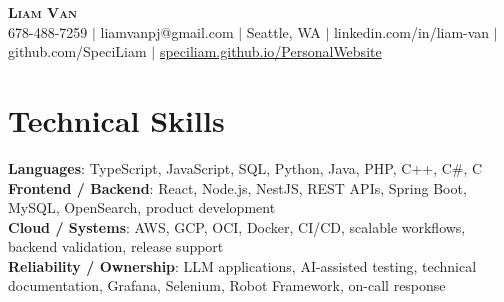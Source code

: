 \documentclass[letterpaper,11pt]{article}
\begin{document}

%
\begin{center}
    \textbf{\Huge \scshape Liam Van} \\ \vspace{1pt}
    \small 678-488-7259 $|$ \small {liamvanpj@gmail.com} $|$ Seattle, WA
 {{$|$ linkedin.com/in/liam-van} {$|$ github.com/SpeciLiam} {$|$ \href{https://speciliam.github.io/PersonalWebsite}{speciliam.github.io/PersonalWebsite}}}

\end{center}

\section{Technical Skills}
 \begin{itemize}[leftmargin=0.15in, label={}]
    \small{\item{
     \textbf{Languages}{: TypeScript, JavaScript, SQL, Python, Java, PHP, C++, C\#, C} \\
     \textbf{Frontend / Backend}{: React, Node.js, NestJS, REST APIs, Spring Boot, MySQL, OpenSearch, product development} \\
     \textbf{Cloud / Systems}{: AWS, GCP, OCI, Docker, CI/CD, scalable workflows, backend validation, release support} \\
     \textbf{Reliability / Ownership}{: LLM applications, AI-assisted testing, technical documentation, Grafana, Selenium, Robot Framework, on-call response} \\
    }}
 \end{itemize}
%
\end{document}
